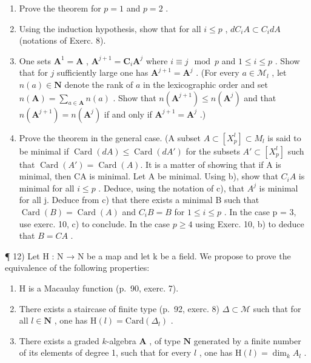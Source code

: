 \begin{enumerate}
\def\labelenumi{\alph{enumi})}
\item
  Prove the theorem for \(p = 1\) and \(p = 2\) .
\item
  Using the induction hypothesis, show that for all \(i \leqslant p\) , \(dC_{i}A \subset C_{i}dA\) (notations of Exerc. 8).
\item
  One sets \(\mathbf{A}^1 = \mathbf{A}\) , \(\mathbf{A}^{j+1} = \mathbf{C}_i\mathbf{A}^j\) where \(i \equiv j \mod p\) and \(1 \leqslant i \leqslant p\) . Show that for \(j\) sufficiently large one has \(\mathbf{A}^{j+1} = \mathbf{A}^j\) . (For every \(a \in \mathcal{M}_l\) , let \(n(a) \in \mathbf{N}\) denote the rank of \(a\) in the lexicographic order and set \(n(\mathbf{A}) = \sum_{a \in \mathbf{A}} n(a)\) . Show that \(n(\mathbf{A}^{j+1}) \leqslant n(\mathbf{A}^j)\) and that \(n(\mathbf{A}^{j+1}) = n(\mathbf{A}^j)\) if and only if \(\mathbf{A}^{j+1} = \mathbf{A}^j\) .)
\item
  Prove the theorem in the general case. (A subset \(A \subset [X_{p}^{l}] \subset M_{l}\) is said to be minimal if \(\operatorname{Card}(dA) \leqslant \operatorname{Card}(dA')\) for the subsets \(A' \subset [X_{p}^{l}]\) such that \(\operatorname{Card}(A') = \operatorname{Card}(A)\). It is a matter of showing that if A is minimal, then CA is minimal. Let A be minimal. Using b), show that \(C_{i}A\) is minimal for all \(i \leqslant p\) . Deduce, using the notation of c), that \(A^{j}\) is minimal for all j. Deduce from c) that there exists a minimal B such that \(\operatorname{Card}(B) = \operatorname{Card}(A)\) and \(C_{i}B = B\) for \(1 \leqslant i \leqslant p\) . In the case p = 3, use exerc. 10, c) to conclude. In the case \(p \geqslant 4\) using Exerc. 10, b) to deduce that \(B = CA\) .
\end{enumerate}

¶ 12) Let H : N → N be a map and let k be a field. We propose to prove the equivalence of the following properties:

\begin{enumerate}
\def\labelenumi{(\roman{enumi})}
\item
  H is a Macaulay function (p.~90, exerc. 7).
\item
  There exists a staircase of finite type (p.~92, exerc. 8) \(\Delta \subset \mathcal{M}\) such that for all \(l \in \mathbf{N}\) , one has \(\mathrm{H}(l) = \mathrm{Card}(\Delta_l)\) .
\item
  There exists a graded \(k\)-algebra \(\mathbf{A}\) , of type \(\mathbf{N}\) generated by a finite number of its elements of degree 1, such that for every \(l\) , one has \(\mathrm{H}(l) = \dim_k A_l\) .
\end{enumerate}

